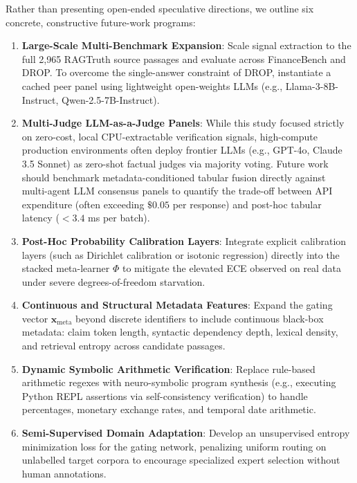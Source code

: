 \documentclass[pdflatex,sn-mathphys,Numbered]{sn-jnl}
\begin{document}
Rather than presenting open-ended speculative directions, we outline six concrete, constructive future-work programs:
\begin{enumerate}
    \item \textbf{Large-Scale Multi-Benchmark Expansion}: Scale signal extraction to the full 2,965 RAGTruth source passages and evaluate across FinanceBench and DROP. To overcome the single-answer constraint of DROP, instantiate a cached peer panel using lightweight open-weights LLMs (e.g., Llama-3-8B-Instruct, Qwen-2.5-7B-Instruct).
    \item \textbf{Multi-Judge LLM-as-a-Judge Panels}: While this study focused strictly on zero-cost, local CPU-extractable verification signals, high-compute production environments often deploy frontier LLMs (e.g., GPT-4o, Claude 3.5 Sonnet) as zero-shot factual judges via majority voting. Future work should benchmark metadata-conditioned tabular fusion directly against multi-agent LLM consensus panels to quantify the trade-off between API expenditure (often exceeding $\$0.05$ per response) and post-hoc tabular latency ($< 3.4$ ms per batch).
    \item \textbf{Post-Hoc Probability Calibration Layers}: Integrate explicit calibration layers (such as Dirichlet calibration or isotonic regression) directly into the stacked meta-learner $\Phi$ to mitigate the elevated ECE observed on real data under severe degrees-of-freedom starvation.
    \item \textbf{Continuous and Structural Metadata Features}: Expand the gating vector $\mathbf{x}_{\mathrm{meta}}$ beyond discrete identifiers to include continuous black-box metadata: claim token length, syntactic dependency depth, lexical density, and retrieval entropy across candidate passages.
    \item \textbf{Dynamic Symbolic Arithmetic Verification}: Replace rule-based arithmetic regexes with neuro-symbolic program synthesis (e.g., executing Python REPL assertions via self-consistency verification) to handle percentages, monetary exchange rates, and temporal date arithmetic.
    \item \textbf{Semi-Supervised Domain Adaptation}: Develop an unsupervised entropy minimization loss for the gating network, penalizing uniform routing on unlabelled target corpora to encourage specialized expert selection without human annotations.
\end{enumerate}

\end{document}
